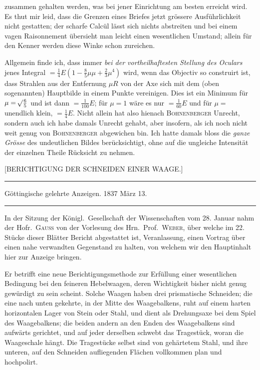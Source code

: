 zusammen gehalten werden, was bei jener Einrichtung am besten erreicht wird. Es thut mir leid, dass die Grenzen eines Briefes jetzt grössere Ausführlichkeit nicht gestatten; der scharfe Calcül lässt sich nichts abstreiten und bei einem vagen Raisonnement übersieht man leicht einen wesentlichen Umstand; allein für den Kenner werden diese Winke schon zureichen.

Allgemein finde ich, dass immer \textit{bei der vortheilhaftesten Stellung des Oculars} jenes Integral $=\tfrac14E(1-\tfrac85\mu\mu+\tfrac23\mu^4)$ wird, wenn das Objectiv so construirt ist, dass Strahlen aus der Entfernung $\mu R$ von der Axe sich mit dem (oben sogenannten) Hauptbilde in einem Punkte vereinigen. Dies ist ein Minimum für $\mu=\mathord{{}^{}\!\surd}\tfrac65$ und ist dann $=\tfrac{1}{100}E$; für $\mu=1$ wäre es nur $=\tfrac{1}{60}E$ und für $\mu=$ unendlich klein, $=\tfrac14E$. Nicht allein hat also hienach \textsc{Bohnenberger} Unrecht, sondern auch ich habe damals Unrecht gehabt, aber insofern, als ich noch nicht weit genug von \textsc{Bohnenberger} abgewichen bin. Ich hatte damals bloss die \textit{ganze Grösse} des undeutlichen Bildes berücksichtigt, ohne auf die ungleiche Intensität der einzelnen Theile Rücksicht zu nehmen.

\clearpage
{}
\begin{center}
{\Large [BERICHTIGUNG DER SCHNEIDEN EINER WAAGE.]\par}
\vspace{7mm}\hrule\vspace{2mm}
Göttingische gelehrte Anzeigen. 1837 März 13.
\vspace{2mm}\hrule\vspace{5mm}
\end{center}
In der Sitzung der Königl.\ Gesellschaft der Wissenschaften vom 28. Januar nahm der Hofr.\ \textsc{Gauss} von der Vorlesung des Hrn.\ Prof.\ \textsc{Weber}, über welche im 22. Stücke dieser Blätter Bericht abgestattet ist, Veranlassung, einen Vortrag über einen nahe verwandten Gegenstand zu halten, von welchem wir den Hauptinhalt hier zur Anzeige bringen.

Er betrifft eine neue Berichtigungsmethode zur Erfüllung einer wesent\-lichen Bedingung bei den feineren Hebelwaagen, deren Wichtigkeit bisher nicht genug gewürdigt zu sein scheint. Solche Waagen haben drei prismatische Schneiden; die eine nach unten gekehrte, in der Mitte des Waagebalkens, ruht auf einem harten horizontalen Lager von Stein oder Stahl, und dient als Drehungsaxe bei dem Spiel des Waagebalkens; die beiden andern an den Enden des Waagebalkens sind aufwärts gerichtet, und auf jeder derselben schwebt das Tragestück, woran die Waageschale hängt. Die Tragestücke selbst sind von gehärtetem Stahl, und ihre unteren, auf den Schneiden aufliegenden Flächen vollkommen plan und hochpolirt.

